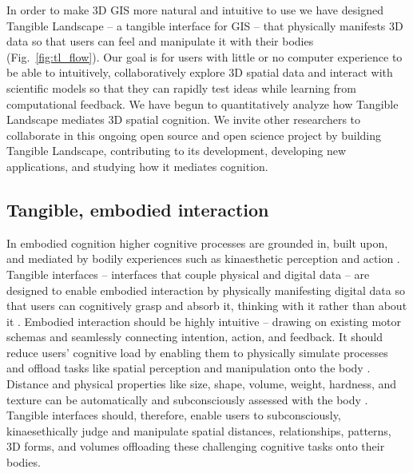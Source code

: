 \documentclass[prodmode,acmtochi]{acmsmall} %
\begin{document}
In order to make 3D GIS more natural and intuitive to use
we have designed Tangible Landscape 
-- a tangible interface for GIS --
that physically manifests 3D data 
so that users can feel and manipulate it with their bodies 
(Fig.~\ref{fig:tl_flow}). 
%
Our goal is for users with little or no computer experience 
to be able to intuitively, collaboratively explore 
3D spatial data 
and interact with scientific models
so that they can 
rapidly test ideas while learning from computational feedback. 
%
We have begun to
quantitatively analyze how 
Tangible Landscape mediates 3D spatial cognition. 
%
We invite other researchers to collaborate 
in this ongoing open source and open science project 
by building Tangible Landscape,
contributing to its development,
developing new applications, 
and studying how it mediates cognition. 

\subsection{Tangible, embodied interaction}

In embodied cognition higher cognitive processes are 
grounded in, built upon, and mediated by bodily experiences 
such as kinaesthetic perception and action \cite{Hardy-Vallee2008}. 
%
Tangible interfaces 
-- interfaces that couple physical and digital data \cite{Dourish2001} -- 
are designed to enable embodied interaction
by physically manifesting digital data 
so that users can cognitively grasp and absorb it,
thinking with it rather than about it \cite{Kirsh2013}. 
%
Embodied interaction should be highly intuitive --
drawing on existing motor schemas
and seamlessly connecting intention, action, and feedback.
%
It should reduce users' cognitive load 
by enabling them to
physically simulate processes 
and offload tasks like 
spatial perception and manipulation onto the body
\cite{Kirsh2013}.
%
%
Distance and physical properties 
like size, shape, volume, weight, hardness, and texture
can be automatically and subconsciously assessed 
with the body \cite{Jeannerod1997}.
Tangible interfaces should, therefore, enable users to
subconsciously, kinaesethically judge and manipulate 
spatial distances, relationships, patterns, 3D forms, and volumes
offloading these challenging cognitive tasks onto their bodies.
\end{document}
